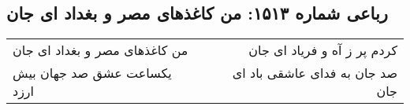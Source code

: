 \begin{center}
\section*{رباعی شماره ۱۵۱۳: من کاغذهای مصر و بغداد ای جان}
\label{sec:1513}
\begin{longtable}{l p{0.5cm} r}
من کاغذهای مصر و بغداد ای جان
&&
کردم پر ز آه و فریاد ای جان
\\
یکساعت عشق صد جهان بیش ارزد
&&
صد جان به فدای عاشقی باد ای جان
\\
\end{longtable}
\end{center}
